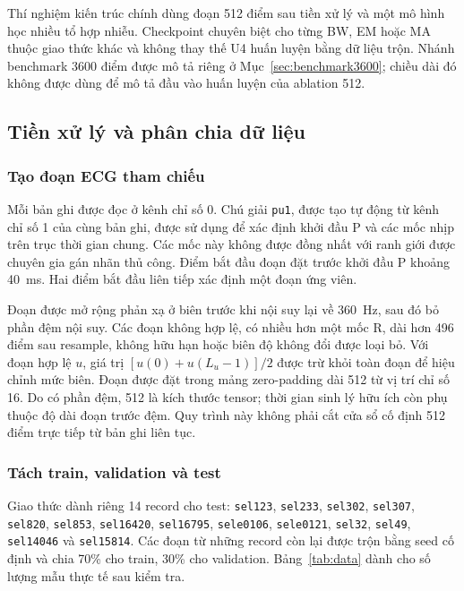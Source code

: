 \documentclass[conference]{IEEEtran}
\begin{document}
Thí nghiệm kiến trúc chính dùng đoạn 512 điểm sau tiền xử lý và một mô hình học nhiều tổ hợp nhiễu. Checkpoint chuyên biệt cho từng BW, EM hoặc MA thuộc giao thức khác và không thay thế U4 huấn luyện bằng dữ liệu trộn. Nhánh benchmark 3600 điểm được mô tả riêng ở Mục~\ref{sec:benchmark3600}; chiều dài đó không được dùng để mô tả đầu vào huấn luyện của ablation 512.

\subsection{Tiền xử lý và phân chia dữ liệu}
\subsubsection{Tạo đoạn ECG tham chiếu}
Mỗi bản ghi được đọc ở kênh chỉ số 0. Chú giải \texttt{pu1}, được tạo tự động từ kênh chỉ số 1 của cùng bản ghi, được sử dụng để xác định khởi đầu P và các mốc nhịp trên trục thời gian chung\cite{qtdb}. Các mốc này không được đồng nhất với ranh giới được chuyên gia gán nhãn thủ công. Điểm bắt đầu đoạn đặt trước khởi đầu P khoảng 40~ms. Hai điểm bắt đầu liên tiếp xác định một đoạn ứng viên.

Đoạn được mở rộng phản xạ ở biên trước khi nội suy lại về 360~Hz, sau đó bỏ phần đệm nội suy. Các đoạn không hợp lệ, có nhiều hơn một mốc R, dài hơn 496 điểm sau resample, không hữu hạn hoặc biên độ không đổi được loại bỏ. Với đoạn hợp lệ $u$, giá trị $[u(0)+u(L_u-1)]/2$ được trừ khỏi toàn đoạn để hiệu chỉnh mức biên. Đoạn được đặt trong mảng zero-padding dài 512 từ vị trí chỉ số 16. Do có phần đệm, 512 là kích thước tensor; thời gian sinh lý hữu ích còn phụ thuộc độ dài đoạn trước đệm. Quy trình này không phải cắt cửa sổ cố định 512 điểm trực tiếp từ bản ghi liên tục.

\subsubsection{Tách train, validation và test}
Giao thức dành riêng 14 record cho test: \texttt{sel123}, \texttt{sel233}, \texttt{sel302}, \texttt{sel307}, \texttt{sel820}, \texttt{sel853}, \texttt{sel16420}, \texttt{sel16795}, \texttt{sele0106}, \texttt{sele0121}, \texttt{sel32}, \texttt{sel49}, \texttt{sel14046} và \texttt{sel15814}. Các đoạn từ những record còn lại được trộn bằng seed cố định và chia 70\% cho train, 30\% cho validation. Bảng~\ref{tab:data} dành cho số lượng mẫu thực tế sau kiểm tra.
\end{document}
